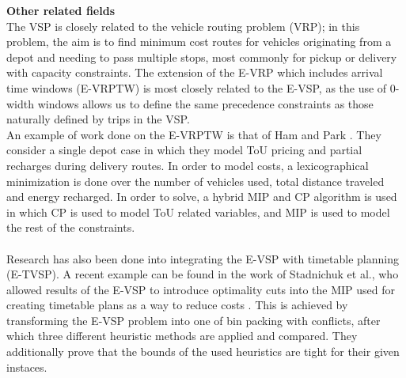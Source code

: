 \documentclass[]{article}
\begin{document}
\noindent \textbf{Other related fields}\\
The VSP is closely related to the vehicle routing problem (VRP); in this problem, the aim is to find minimum cost routes for vehicles originating from a depot and needing to pass multiple stops, most commonly for pickup or delivery with capacity constraints. The extension of the E-VRP which includes arrival time windows (E-VRPTW) is most closely related to the E-VSP, as the use of 0-width windows allows us to define the same precedence constraints as those naturally defined by trips in the VSP. \\
An example of work done on the E-VRPTW is that of Ham and Park \cite{Ham2021}. They consider a single depot case in which they model ToU pricing and partial recharges during delivery routes. In order to model costs, a lexicographical minimization is done over the number of vehicles used, total distance traveled and energy recharged. In order to solve, a hybrid MIP and CP algorithm is used in which CP is used to model ToU related variables, and MIP is used to model the rest of the constraints. \\\\
Research has also been done into integrating the E-VSP with timetable planning (E-TVSP). A recent example can be found in the work of Stadnichuk et al., who allowed results of the E-VSP to introduce optimality cuts into the MIP used for creating timetable plans as a way to reduce costs \cite{Stadnichuk2024}. This is achieved by transforming the E-VSP problem into one of bin packing with conflicts, after which three different heuristic methods are applied and compared. They additionally prove that the bounds of the used heuristics are tight for their given instaces. \\\\
\end{document}
